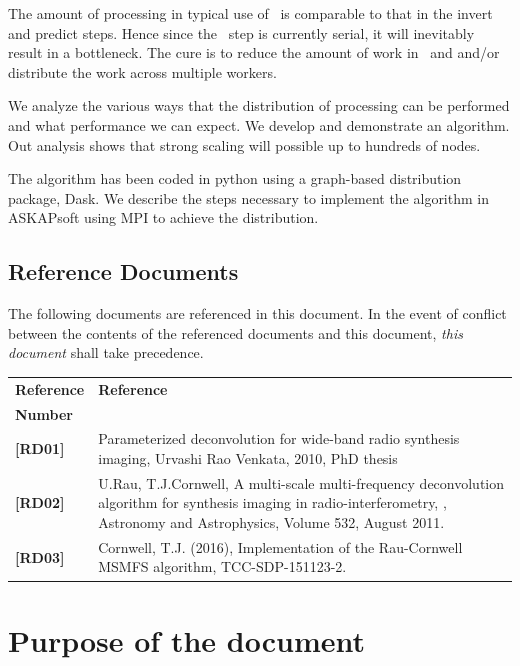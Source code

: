 \documentclass[11pt,a4paper,variablewidth]{article}
\begin{document}
The amount of processing in typical use of \MAM\ is comparable to that in the invert and predict steps. Hence since the \MAM\ step is currently serial, it will inevitably result in a bottleneck. The cure is to reduce the amount of work in \MAM\ and and/or distribute the work across multiple workers.

We analyze the various ways that the distribution of processing can be performed and what performance we can expect. We develop and demonstrate an algorithm. Out analysis shows that strong scaling will possible up to hundreds of nodes.

The algorithm has been coded in python using a graph-based distribution package, Dask. We describe the steps necessary to implement the algorithm in ASKAPsoft using MPI to achieve the distribution.

\newpage

\subsection*{Reference Documents}

The following documents are referenced in this document. In the event of
conflict between the contents of the referenced documents and this document,
\emph{this document} shall take precedence.

 \begin{center}
 \begin{tabularx}{\textwidth}{|l|X|}
     \hline
     \bf{Reference} & \bf{Reference}\\
     \bf{Number} & \\
     \hline
     {\bf [RD01]} & Parameterized deconvolution for wide-band radio synthesis imaging, Urvashi Rao Venkata, 2010, PhD thesis\\
     {\bf [RD02]} & U.Rau, T.J.Cornwell, A multi-scale multi-frequency deconvolution algorithm for synthesis imaging in radio-interferometry, , Astronomy and Astrophysics, Volume 532, August 2011.\\
	{\bf [RD03]} & Cornwell, T.J. (2016), Implementation of the Rau-Cornwell MSMFS algorithm, TCC-SDP-151123-2. \\
	\hline
 \end{tabularx}
\end{center}

\pagebreak
\section{Purpose of the document}
\end{document}
